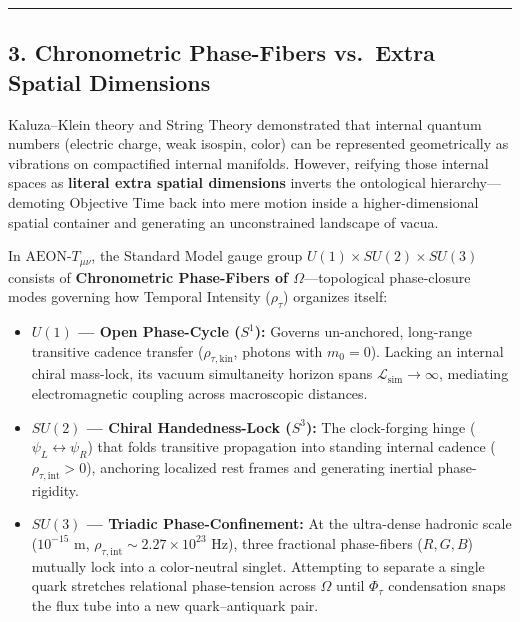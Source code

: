 \documentclass[
]{article}
\providecommand{\tightlist}{%
  \setlength{\itemsep}{0pt}\setlength{\parskip}{0pt}}
\begin{document}
\begin{center}\rule{0.5\linewidth}{0.5pt}\end{center}

\subsection{3. Chronometric Phase-Fibers vs.~Extra Spatial
Dimensions}\label{chronometric-phase-fibers-vs.-extra-spatial-dimensions}

Kaluza--Klein theory and String Theory demonstrated that internal
quantum numbers (electric charge, weak isospin, color) can be
represented geometrically as vibrations on compactified internal
manifolds. However, reifying those internal spaces as \textbf{literal
extra spatial dimensions} inverts the ontological hierarchy---demoting
Objective Time back into mere motion inside a higher-dimensional spatial
container and generating an unconstrained landscape of vacua.

In \(\text{AEON-}T_{\mu\nu}\), the Standard Model gauge group
\(U(1) \times SU(2) \times SU(3)\) consists of \textbf{Chronometric
Phase-Fibers of \(\Omega\)}---topological phase-closure modes governing
how Temporal Intensity (\(\rho_\tau\)) organizes itself:

\begin{itemize}
\tightlist
\item
  \textbf{\(U(1)\) --- Open Phase-Cycle (\(S^1\)):} Governs un-anchored,
  long-range transitive cadence transfer (\(\rho_{\tau,\text{kin}}\),
  photons with \(m_0 = 0\)). Lacking an internal chiral mass-lock, its
  vacuum simultaneity horizon spans
  \(\mathcal{L}_{\text{sim}} \to \infty\), mediating electromagnetic
  coupling across macroscopic distances.
\item
  \textbf{\(SU(2)\) --- Chiral Handedness-Lock (\(S^3\)):} The
  clock-forging hinge (\(\psi_L \leftrightarrow \psi_R\)) that folds
  transitive propagation into standing internal cadence
  (\(\rho_{\tau,\text{int}} > 0\)), anchoring localized rest frames and
  generating inertial phase-rigidity.
\item
  \textbf{\(SU(3)\) --- Triadic Phase-Confinement:} At the ultra-dense
  hadronic scale (\(10^{-15}\text{ m}\),
  \(\rho_{\tau,\text{int}} \sim 2.27 \times 10^{23}\text{ Hz}\)), three
  fractional phase-fibers (\(R, G, B\)) mutually lock into a
  color-neutral singlet. Attempting to separate a single quark stretches
  relational phase-tension across \(\Omega\) until \(\Phi_\tau\)
  condensation snaps the flux tube into a new quark--antiquark pair.
\end{itemize}
\end{document}
